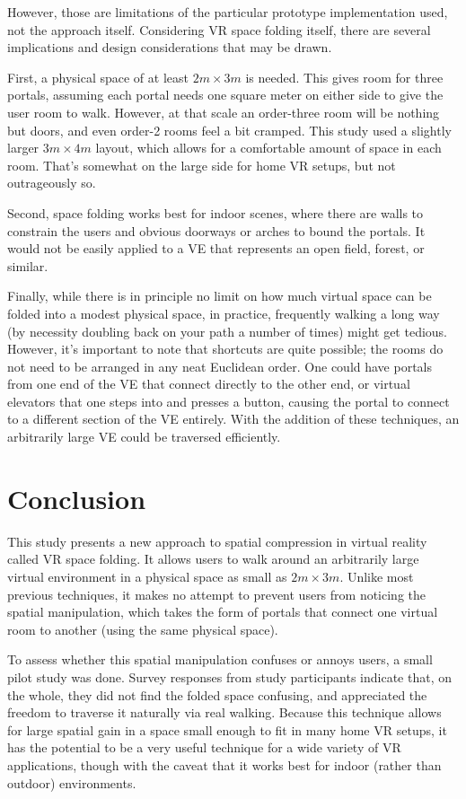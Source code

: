 \documentclass{sigchi}
\begin{document}
However, those are limitations of the particular prototype implementation used, not the approach itself.  Considering VR space folding itself, there are several implications and design considerations that may be drawn.

First, a physical space of at least $2 m \times 3 m$ is needed.  This gives room for three portals, assuming each portal needs one square meter on either side to give the user room to walk.  However, at that scale an order-three room will be nothing but doors, and even order-2 rooms feel a bit cramped.  This study used a slightly larger $3 m \times 4 m$ layout, which allows for a comfortable amount of space in each room. That’s somewhat on the large side for home VR setups, but not outrageously so.

Second, space folding works best for indoor scenes, where there are walls to constrain the users and obvious doorways or arches to bound the portals.  It would not be easily applied to a VE that represents an open field, forest, or similar.

Finally, while there is in principle no limit on how much virtual space can be folded into a modest physical space, in practice, frequently walking a long way (by necessity doubling back on your path a number of times) might get tedious.  However, it’s important to note that shortcuts are quite possible; the rooms do not need to be arranged in any neat Euclidean order.  One could have portals from one end of the VE that connect directly to the other end, or virtual elevators that one steps into and presses a button, causing the portal to connect to a different section of the VE entirely.  With the addition of these techniques, an arbitrarily large VE could be traversed efficiently.
	
\section{Conclusion}

This study presents a new approach to spatial compression in virtual reality called VR space folding.  It allows users to walk around an arbitrarily large virtual environment in a physical space as small as $2 m \times 3 m$.  Unlike most previous techniques, it makes no attempt to prevent users from noticing the spatial manipulation, which takes the form of portals that connect one virtual room to another (using the same physical space).  

To assess whether this spatial manipulation confuses or annoys users, a small pilot study was done.  Survey responses from study participants indicate that, on the whole, they did not find the folded space confusing, and appreciated the freedom to traverse it naturally via real walking.  Because this technique allows for large spatial gain in a space small enough to fit in many home VR setups, it has the potential to be a very useful technique for a wide variety of VR applications, though with the caveat that it works best for indoor (rather than outdoor) environments.
\end{document}
